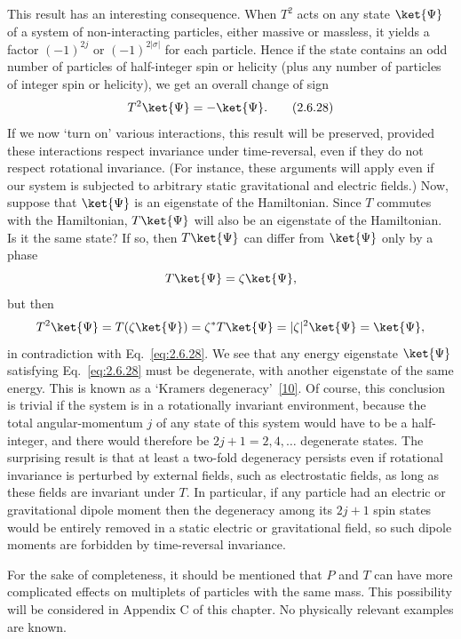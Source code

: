This result has an interesting consequence. When $T^2$ acts on any state
$\ket{\Psi}$ of a system of non-interacting particles, either massive or
massless, it yields a factor $(-1)^{2j}$ or $(-1)^{2|\sigma|}$ for each
particle. Hence if the state contains an odd number of particles of
half-integer spin or helicity (plus any number of particles of integer spin or
helicity), we get an overall change of sign
\begin{equation}
T^2\ket{\Psi}=-\ket{\Psi}.
\tag{2.6.28}\label{eq:2.6.28}
\end{equation}
If we now `turn on' various interactions, this result will be preserved,
provided these interactions respect invariance under time-reversal, even if
they do not respect rotational invariance. (For instance, these arguments
will apply even if our system is subjected to arbitrary static gravitational
and electric fields.) Now, suppose that $\ket{\Psi}$ is an eigenstate of the
Hamiltonian. Since $T$ commutes with the Hamiltonian, $T\ket{\Psi}$ will also
be an eigenstate of the Hamiltonian. Is it the same state? If so, then
$T\ket{\Psi}$ can differ from $\ket{\Psi}$ only by a phase
\[
T\ket{\Psi}=\zeta\ket{\Psi},
\]
but then
\[
T^2\ket{\Psi}=T(\zeta\ket{\Psi})
=\zeta^*T\ket{\Psi}=|\zeta|^2\ket{\Psi}=\ket{\Psi},
\]
in contradiction with Eq.~\eqref{eq:2.6.28}. We see that any energy eigenstate
$\ket{\Psi}$ satisfying Eq.~\eqref{eq:2.6.28} must be degenerate, with another
eigenstate of the same energy. This is known as a `Kramers
degeneracy'~\hyperref[ref:2.10]{[10]}. Of course, this conclusion is trivial if the
system is in a rotationally invariant environment, because the total
angular-momentum $j$ of any state of this system would have to be a
half-integer, and there would therefore be $2j+1=2,4,\ldots$ degenerate states.
The surprising result is that at least a two-fold degeneracy persists even if
rotational invariance is perturbed by external fields, such as electrostatic
fields, as long as these fields are invariant under $T$. In particular, if
any particle had an electric or gravitational dipole moment then the
degeneracy among its $2j+1$ spin states would be entirely removed in a static
electric or gravitational field, so such dipole moments are forbidden by
time-reversal invariance.

For the sake of completeness, it should be mentioned that $P$ and $T$ can
have more complicated effects on multiplets of particles with the same mass.
This possibility will be considered in Appendix C of this chapter. No
physically relevant examples are known.
